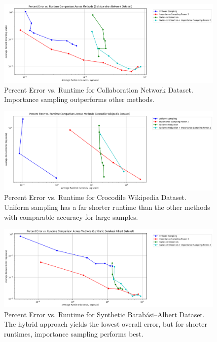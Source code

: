 \documentclass[11pt, margin=1in]{article}
\begin{document}
\begin{figure}[H]
\centering
\includegraphics[width=0.9\linewidth]{plots/comparisons/GrQc/limited_method_percent_error_vs_runtime_comparison.png}
\caption{Percent Error vs. Runtime for Collaboration Network Dataset. Importance sampling outperforms other methods.}
\label{fig:grqc_runtime}
\end{figure}

\begin{figure}[H]
\centering
\includegraphics[width=0.9\linewidth]{plots/comparisons/croc/limited_method_percent_error_vs_runtime_comparison.png}
\caption{Percent Error vs. Runtime for Crocodile Wikipedia Dataset. Uniform sampling has a far shorter runtime than the other methods with comparable accuracy for large samples.}
\label{fig:croc_runtime}
\end{figure}

\begin{figure}[H]
\centering
\includegraphics[width=0.9\linewidth]{plots/comparisons/ba/limited_method_percent_error_vs_runtime_comparison.png}
\caption{Percent Error vs. Runtime for Synthetic Barabási–Albert Dataset. The hybrid approach yields the lowest overall error, but for shorter runtimes, importance sampling performs best.}
\label{fig:ba_runtime}
\end{figure}
\end{document}
